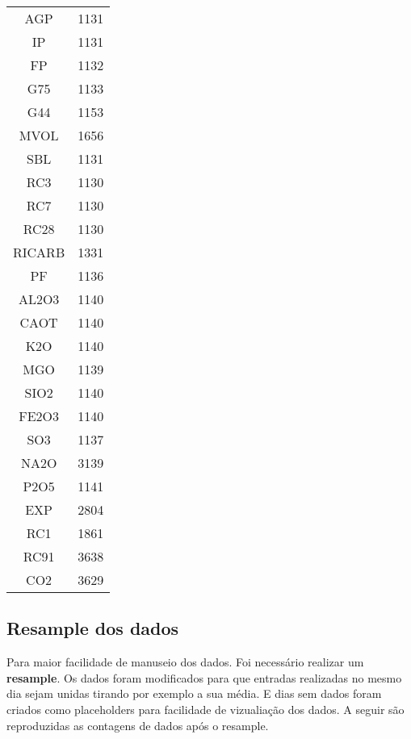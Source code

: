 \begin{center}
\begin{tabular}{ c c }
AGP     &  1131\\
IP      &  1131\\
FP      &  1132\\
G75    &  1133\\
G44   &  1153\\
MVOL    &  1656\\
SBL     &  1131\\
RC3     &  1130\\
RC7     &  1130\\
RC28    &  1130\\
RICARB  &  1331\\
PF      &  1136\\
AL2O3   &  1140\\
CAOT    &  1140\\
K2O     &  1140\\
MGO     &  1139\\
SIO2    &  1140\\
FE2O3   &  1140\\
SO3     &  1137\\
NA2O    &  3139\\
P2O5    &  1141\\
EXP     &  2804\\
RC1     &  1861\\
RC91    &  3638\\
CO2     &  3629 
\end{tabular}
\end{center}





\subsection{Resample dos dados}
Para maior facilidade de manuseio dos dados. Foi necessário realizar um \textbf{resample}. Os dados foram modificados para que entradas realizadas no mesmo dia sejam unidas tirando por exemplo a sua média. E dias sem dados foram criados como placeholders para facilidade de vizualiação dos dados. A seguir são reproduzidas as contagens de dados após o resample.


